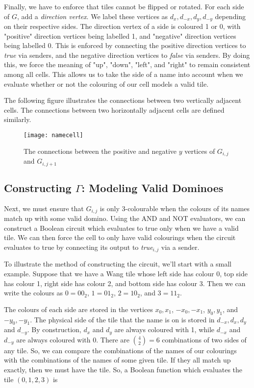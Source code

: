 \documentclass[letterpaper]{article}
\begin{document}
Finally, we have to enforce that tiles cannot be flipped or rotated.
For each side of $G$, add a \emph{direction vertex}.
We label these vertices as $d_x, d_{-x}, d_y, d_{-y}$ depending on their respective sides.
The direction vertex of a side is coloured 1 or 0, with "positive" direction vertices being labelled 1, and "negative" direction vertices being labelled 0.
This is enforced by connecting the positive direction vertices to \emph{true} via senders, and the negative direction vertices to \emph{false} via senders.
By doing this, we force the meaning of "up", "down", "left", and "right" to remain consistent among all cells.
This allows us to take the side of a name into account when we evaluate whether or not the colouring of our cell models a valid tile.

The following figure illustrates the connections between two vertically adjacent cells. The connections between two horizontally adjacent cells are defined similarly.

\begin{figure}[H]
\centering
\caption{The connections between the positive and negative $y$ vertices of $G_{i,j}$ and $G_{i, j+1}$}
\texttt{[image: namecell]}
\end{figure}


\subsection{Constructing $\Gamma$: Modeling Valid Dominoes}

Next, we must ensure that $G_{i,j}$ is only 3-colourable when the colours of its names match up with some valid domino.
Using the AND and NOT evaluators, we can construct a Boolean circuit which evaluates to true only when we have a valid tile.
We can then force the cell to only have valid colourings when the circuit evaluates to true by connecting its output to \emph{true$_{i,j}$} via a sender.

To illustrate the method of constructing the circuit, we'll start with a small example.
Suppose that we have a Wang tile whose left side has colour 0, top side has colour 1, right side has colour 2, and bottom side has colour 3. Then we can write the colours as $0 = 00_2$, $1 = 01_2$, $2 = 10_2$, and $3 = 11_2$.

The colours of each side are stored in the vertices $x_0, x_1$, $-x_0, -x_1$, $y_0, y_1$, and $-y_0,-y_1$.
The physical side of the tile that the name is on is stored in $d_{-x}, d_x, d_y$ and $d_{-y}$.
By construction, $d_x$ and $d_y$ are always coloured with 1, while $d_{-x}$ and $d_{-y}$ are always coloured with 0.
There are $\binom{4}{2} = 6$ combinations of two sides of any tile.
So, we can compare the combinations of the names of our colourings with the combinations of the names of some given tile.
If they all match up exactly, then we must have the tile.
So, a Boolean function which evaluates the tile $(0,1,2,3)$ is
\end{document}
